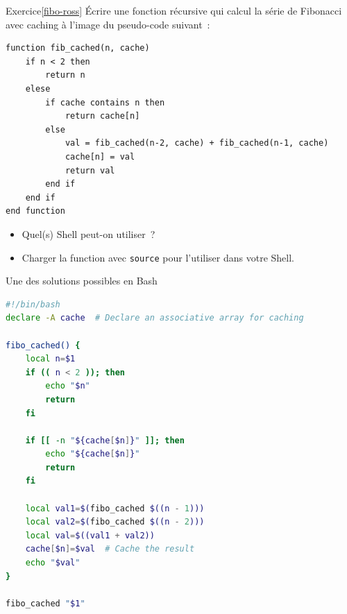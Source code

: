 \documentclass{beamer}
\begin{document}
    \begin{frame}[fragile]{Exercice\cref{fibo-ross} \execcounterdispinc{}}
        Écrire une fonction récursive qui calcul la série de Fibonacci avec caching à l'image du pseudo-code suivant~:
        \begin{footnotesize}
            \begin{verbatim}
function fib_cached(n, cache)
    if n < 2 then
        return n
    elese
        if cache contains n then
            return cache[n]
        else
            val = fib_cached(n-2, cache) + fib_cached(n-1, cache)
            cache[n] = val
            return val
        end if
    end if
end function
            \end{verbatim}
        \end{footnotesize}
        \begin{itemize}
            \item Quel(s) Shell peut-on utiliser~?
            \item Charger la function avec \lstinline{source} pour l'utiliser dans votre Shell.
        \end{itemize}
    \end{frame}

    \begin{frame}[fragile]{Une des solutions possibles en Bash}
        \begin{lstlisting}[language=bash]
#!/bin/bash
declare -A cache  # Declare an associative array for caching

fibo_cached() {
    local n=$1
    if (( n < 2 )); then
        echo "$n"
        return
    fi

    if [[ -n "${cache[$n]}" ]]; then
        echo "${cache[$n]}"
        return
    fi

    local val1=$(fibo_cached $((n - 1)))
    local val2=$(fibo_cached $((n - 2)))
    local val=$((val1 + val2))
    cache[$n]=$val  # Cache the result
    echo "$val"
}

fibo_cached "$1"
        \end{lstlisting}
    \end{frame}
\end{document}
